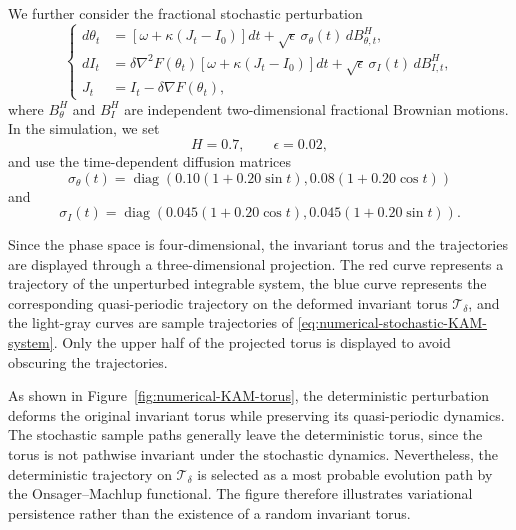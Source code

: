 \documentclass[preprint,12pt]{elsarticle}
\theoremstyle{definition}
\theoremstyle{plain}
\begin{document}
We further consider the fractional stochastic perturbation
\begin{equation}
\label{eq:numerical-stochastic-KAM-system}
\left\{
\begin{aligned}
    d\theta_t
    &=
    \left[
        \omega+\kappa(J_t-I_0)
    \right]dt
    +
    \sqrt{\epsilon}\,
    \sigma_\theta(t)\,dB_{\theta,t}^H,
    \\
    dI_t
    &=
    \delta\nabla^2F(\theta_t)
    \left[
        \omega+\kappa(J_t-I_0)
    \right]dt
    +
    \sqrt{\epsilon}\,
    \sigma_I(t)\,dB_{I,t}^H,
    \\
    J_t
    &=
    I_t-\delta\nabla F(\theta_t),
\end{aligned}
\right.
\end{equation}
where $B_\theta^H$ and $B_I^H$ are independent two-dimensional
fractional Brownian motions. In the simulation, we set
\begin{equation*}
    H=0.7,
    \qquad
    \epsilon=0.02,
\end{equation*}
and use the time-dependent diffusion matrices
\begin{equation*}
    \sigma_\theta(t)
    =
    \operatorname{diag}
    \left(
        0.10(1+0.20\sin t),
        0.08(1+0.20\cos t)
    \right)
\end{equation*}
and
\begin{equation*}
    \sigma_I(t)
    =
    \operatorname{diag}
    \left(
        0.045(1+0.20\cos t),
        0.045(1+0.20\sin t)
    \right).
\end{equation*}

Since the phase space is four-dimensional, the invariant torus and
the trajectories are displayed through a three-dimensional
projection. The red curve represents a trajectory of the unperturbed
integrable system, the blue curve represents the corresponding
quasi-periodic trajectory on the deformed invariant torus
$\mathcal T_\delta$, and the light-gray curves are sample trajectories
of \eqref{eq:numerical-stochastic-KAM-system}. Only the upper half of
the projected torus is displayed to avoid obscuring the trajectories.

As shown in Figure~\ref{fig:numerical-KAM-torus}, the deterministic
perturbation deforms the original invariant torus while preserving its
quasi-periodic dynamics. The stochastic sample paths generally leave
the deterministic torus, since the torus is not pathwise invariant
under the stochastic dynamics. Nevertheless, the deterministic
trajectory on $\mathcal T_\delta$ is selected as a most probable
evolution path by the Onsager--Machlup functional. The figure therefore
illustrates variational persistence rather than the existence of a
random invariant torus.
\end{document}
